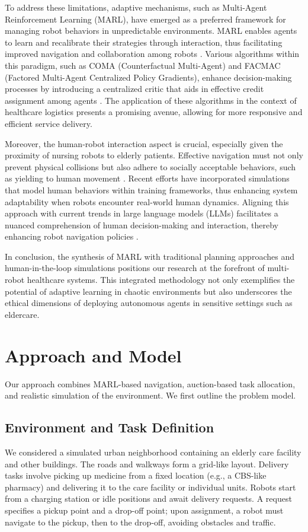 \documentclass[conference]{IEEEtran}
\begin{document}
To address these limitations, adaptive mechanisms, such as Multi-Agent Reinforcement Learning (MARL), have emerged as a preferred framework for managing robot behaviors in unpredictable environments. MARL enables agents to learn and recalibrate their strategies through interaction, thus facilitating improved navigation and collaboration among robots \citep{liu2023}. Various algorithms within this paradigm, such as COMA (Counterfactual Multi-Agent) and FACMAC (Factored Multi-Agent Centralized Policy Gradients), enhance decision-making processes by introducing a centralized critic that aids in effective credit assignment among agents \citep{wang2023a}. The application of these algorithms in the context of healthcare logistics presents a promising avenue, allowing for more responsive and efficient service delivery.

Moreover, the human-robot interaction aspect is crucial, especially given the proximity of nursing robots to elderly patients. Effective navigation must not only prevent physical collisions but also adhere to socially acceptable behaviors, such as yielding to human movement \citep{rostumi2019}. Recent efforts have incorporated simulations that model human behaviors within training frameworks, thus enhancing system adaptability when robots encounter real-world human dynamics. Aligning this approach with current trends in large language models (LLMs) facilitates a nuanced comprehension of human decision-making and interaction, thereby enhancing robot navigation policies \citep{yang2022}.

In conclusion, the synthesis of MARL with traditional planning approaches and human-in-the-loop simulations positions our research at the forefront of multi-robot healthcare systems. This integrated methodology not only exemplifies the potential of adaptive learning in chaotic environments but also underscores the ethical dimensions of deploying autonomous agents in sensitive settings such as eldercare.

\section{Approach and Model}
\label{sec:approach}
Our approach combines MARL-based navigation, auction-based task allocation, and realistic simulation of the environment. We first outline the problem model.

\subsection{Environment and Task Definition}
We considered a simulated urban neighborhood containing an elderly care facility and other buildings. The roads and walkways form a grid-like layout. Delivery tasks involve picking up medicine from a fixed location (e.g., a CBS-like pharmacy) and delivering it to the care facility or individual units. Robots start from a charging station or idle positions and await delivery requests. A request specifies a pickup point and a drop-off point; upon assignment, a robot must navigate to the pickup, then to the drop-off, avoiding obstacles and traffic.
\end{document}
